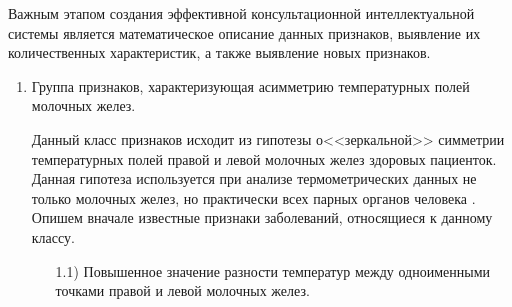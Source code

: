 Важным этапом создания эффективной консультационной
интеллектуальной системы является математическое описание данных
признаков, выявление их количественных характеристик, а также
выявление новых признаков.

\begin{enumerate}
    \item Группа признаков, характеризующая асимметрию температурных полей молочных желез.

Данный класс признаков исходит из гипотезы о<<зеркальной>> симметрии температурных полей правой и левой молочных желез
здоровых пациенток. Данная гипотеза используется при анализе
термометрических данных не только молочных желез, но практически
всех парных органов человека \cite{losevhoperskov}. Опишем вначале
известные признаки заболеваний, относящиеся к данному классу.
    \begin{enumerate}
        \item[1.1)] Повышенное значение разности температур между одноименными точками правой и
        левой молочных желез.


\end{enumerate}
\end{enumerate}
